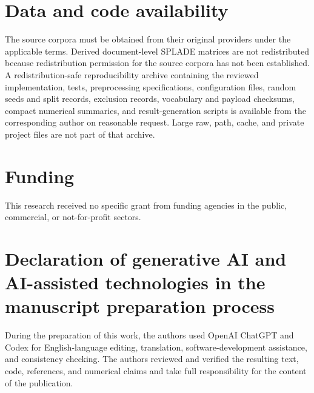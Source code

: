 \documentclass[preprint,12pt,authoryear]{elsarticle}
\begin{document}
\section*{Data and code availability}

The source corpora must be obtained from their original providers under the
applicable terms. Derived document-level SPLADE matrices are not redistributed
because redistribution permission for the source corpora has not been
established. A redistribution-safe reproducibility archive containing the
reviewed implementation, tests, preprocessing specifications, configuration
files, random seeds and split records, exclusion records, vocabulary and
payload checksums, compact numerical summaries, and result-generation scripts
is available from the corresponding author on reasonable request. Large raw,
path, cache, and private project files are not part of that archive.

\section*{Funding}

This research received no specific grant from funding agencies in the public,
commercial, or not-for-profit sectors.

\section*{Declaration of generative AI and AI-assisted technologies in the manuscript preparation process}

During the preparation of this work, the authors used OpenAI ChatGPT and Codex
for English-language editing, translation, software-development assistance,
and consistency checking. The authors reviewed and verified the resulting
text, code, references, and numerical claims and take full responsibility for
the content of the publication.



\end{document}
